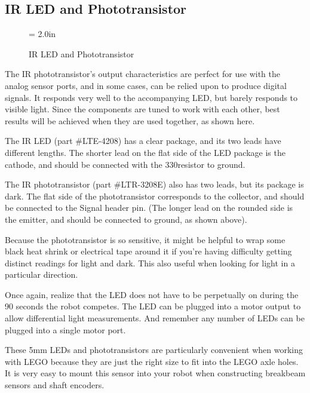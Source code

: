 \subsection{IR LED and Phototransistor}

\begin{figure}[htbp]
 \centerline{\epsfysize = 2.0in}
 \caption{IR LED and Phototransistor}
 \label{ledptransistor}
\end{figure}

The IR phototransistor's output characteristics are perfect for use with
the analog sensor ports, and in some cases, can be relied upon to produce
digital signals. It responds very well to the accompanying LED, but
barely responds to visible light. Since the components are tuned to
work with each other, best results will be achieved when they are used
together, as shown here.

The IR LED (part \#LTE-4208) has a clear package, and its two leads have different lengths.  The shorter lead on the flat side of the LED package is the cathode, and
 should be connected with the 330\ohm resistor to ground.  

The IR phototransistor (part \#LTR-3208E) also has two leads, but its package is dark.  The flat side of the phototransistor corresponds to the collector, and should be connected to the Signal header pin.  (The longer lead on the rounded side is the emitter, and should be connected to ground, as shown above).

Because the phototransistor is so sensitive, it might be helpful to wrap
some black heat shrink or electrical tape around it if you're having difficulty getting distinct readings for light and dark.  This also useful when
looking for light in a particular direction.

Once again, realize that the LED does not have to be perpetually on
during the 90 seconds the robot competes.  The LED can be plugged into
a motor output to allow differential light measurements.  And remember
any number of LEDs can be plugged into a single motor port.

These 5mm LEDs and phototransistors are particularly convenient when working with LEGO
because they are just the right size to fit into the LEGO axle holes.
It is very easy to mount this sensor into your robot when constructing
breakbeam sensors and shaft encoders.
